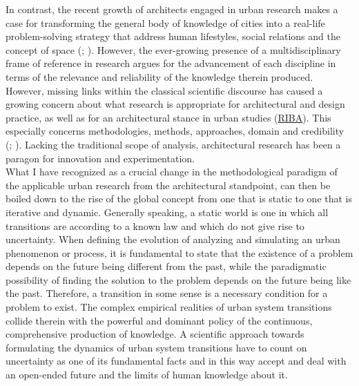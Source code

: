 \documentclass[11pt]{report}
\begin{document}
In contrast, the recent growth of architects engaged in urban research makes a case for transforming the general body of knowledge of cities into a real-life problem-solving strategy that address human lifestyles, social relations and the concept of space (\href{ref}{\citealt{castells_rise_2000}}; \href{ref}{\citealt{van_dijk_textlesstextlessthetextgreatertextgreater_2002}}).
However, the ever-growing presence of a multidisciplinary frame of reference in research  argues for the advancement of each discipline in terms of the relevance and reliability of the knowledge therein produced.  However, missing links within the classical scientific discourse has caused a growing concern about what research is appropriate for architectural and design practice, as well as for an architectural stance in urban studies (\href{RIBA}{RIBA}). This especially concerns methodologies, methods, approaches, domain and credibility ({\citealt{savic_what_2014}; \citealt{savic_introduction:_2016}). Lacking the traditional scope of analysis, architectural research has been a paragon for innovation and experimentation.
\\

What I have recognized as a crucial change in the methodological paradigm of the applicable urban research from the architectural standpoint, can then be boiled down to the rise of the global concept from one that is static to one that is iterative and dynamic.
Generally speaking, a static world is one in which all transitions are according to a known law and which do not give rise to uncertainty. When defining the evolution of analyzing and simulating an urban phenomenon or process, it is fundamental to state that the existence of a problem depends on the future being different from the past, while the paradigmatic possibility of finding the solution to the problem depends on the future being like the past. Therefore, a transition in some sense is a necessary condition for a problem to exist. The complex empirical realities of urban system transitions collide therein with the powerful and dominant policy of the continuous, comprehensive production of knowledge. A scientific approach towards formulating the dynamics of urban system transitions have to count on uncertainty as one of its fundamental facts and in this way accept and deal with an open-ended future and the limits of human knowledge about it.
\\

}
\end{document}
